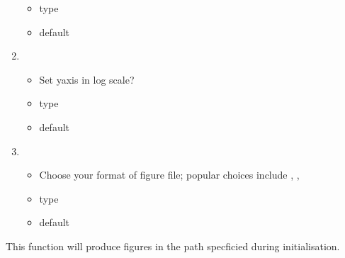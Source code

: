 \documentclass[letterpaper,10pt,english]{sphinxmanual}
\begin{document}
\begin{enumerate}
\begin{itemize}
\item {} 
\sphinxAtStartPar
type 

\item {} 
\sphinxAtStartPar
default 

\end{itemize}

\item {} 
\sphinxAtStartPar
{}
\begin{itemize}
\item {} 
\sphinxAtStartPar
Set y\sphinxhyphen{}axis in log scale?

\item {} 
\sphinxAtStartPar
type 

\item {} 
\sphinxAtStartPar
default 

\end{itemize}

\item {} 
\sphinxAtStartPar
{}
\begin{itemize}
\item {} 
\sphinxAtStartPar
Choose your format of figure file; popular choices include
, , 

\item {} 
\sphinxAtStartPar
type 

\item {} 
\sphinxAtStartPar
default 

\end{itemize}

\end{enumerate}

\sphinxAtStartPar
This function will produce figures in the path specficied during
initialisation.

\sphinxstepscope
\end{document}
